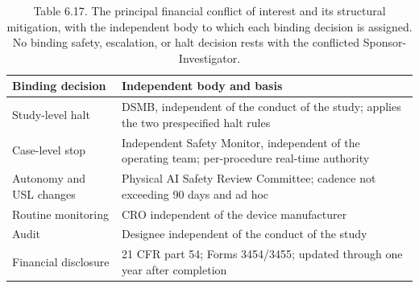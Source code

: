 \begin{table}[t]
\caption{Table 6.17. The principal financial conflict of interest and its structural
mitigation, with the independent body to which each binding decision is assigned. No
binding safety, escalation, or halt decision rests with the conflicted
Sponsor-Investigator.}
\label{tab:sec06-coi}
\centering
\begin{tabularx}{\textwidth}{L{4.4cm} Y}
\toprule
\textbf{Binding decision} & \textbf{Independent body and basis} \\
\midrule
Study-level halt & DSMB, independent of the conduct of the study; applies the two prespecified halt rules \\
Case-level stop & Independent Safety Monitor, independent of the operating team; per-procedure real-time authority \\
Autonomy and USL changes & Physical AI Safety Review Committee; cadence not exceeding 90 days and ad hoc \\
Routine monitoring & CRO independent of the device manufacturer \\
Audit & Designee independent of the conduct of the study \\
Financial disclosure & 21 CFR part 54; Forms 3454/3455; updated through one year after completion \\
\bottomrule
\end{tabularx}
\end{table}
